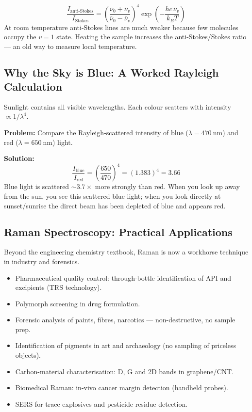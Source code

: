 \documentclass[12pt,a4paper]{article}
\begin{document}
\begin{tcolorbox}[formulabox, title={Stokes / Anti-Stokes Intensity Ratio}]
\[
\frac{I_{\text{anti-Stokes}}}{I_{\text{Stokes}}} = \!\left(\frac{\bar{\nu}_0+\bar{\nu}_v}{\bar{\nu}_0-\bar{\nu}_v}\right)^{\!4}\exp\!\left(-\frac{hc\,\bar{\nu}_v}{k_B T}\right)
\]
At room temperature anti-Stokes lines are much weaker because few molecules occupy the $v=1$ state. Heating the sample increases the anti-Stokes/Stokes ratio --- an old way to measure local temperature.
\end{tcolorbox}

\subsection{Why the Sky is Blue: A Worked Rayleigh Calculation}
Sunlight contains all visible wavelengths. Each colour scatters with intensity $\propto 1/\lambda^{4}$.

\begin{tcolorbox}[examplebox, title={Solved Example: Blue / Red Scattering Ratio}]
\textbf{Problem:} Compare the Rayleigh-scattered intensity of blue ($\lambda=470\ \mathrm{nm}$) and red ($\lambda=650\ \mathrm{nm}$) light.

\textbf{Solution:}
\[
\frac{I_{\mathrm{blue}}}{I_{\mathrm{red}}}=\!\left(\frac{650}{470}\right)^{\!4}=(1.383)^{4}=3.66
\]
Blue light is scattered $\sim 3.7\times$ more strongly than red. When you look up away from the sun, you see this scattered blue light; when you look directly at sunset/sunrise the direct beam has been depleted of blue and appears red.
\end{tcolorbox}

\subsection{Raman Spectroscopy: Practical Applications}
Beyond the engineering chemistry textbook, Raman is now a workhorse technique in industry and forensics.

\begin{itemize}[leftmargin=*, itemsep=1pt, topsep=2pt]
  \item Pharmaceutical quality control: through-bottle identification of API and excipients (TRS technology).
  \item Polymorph screening in drug formulation.
  \item Forensic analysis of paints, fibres, narcotics --- non-destructive, no sample prep.
  \item Identification of pigments in art and archaeology (no sampling of priceless objects).
  \item Carbon-material characterisation: D, G and 2D bands in graphene/CNT.
  \item Biomedical Raman: in-vivo cancer margin detection (handheld probes).
  \item SERS for trace explosives and pesticide residue detection.
\end{itemize}
\end{document}
